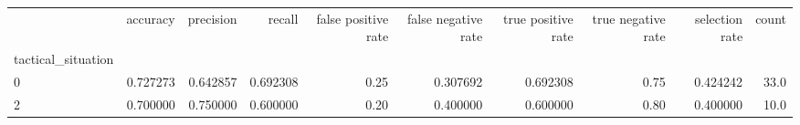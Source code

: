 \begin{tabular}{lrrrrrrrrr}
\toprule
{} &  accuracy &  precision &    recall &  false positive rate &  false negative rate &  true positive rate &  true negative rate &  selection rate &  count \\
tactical\_situation &           &            &           &                      &                      &                     &                     &                 &        \\
\midrule
0                  &  0.727273 &   0.642857 &  0.692308 &                 0.25 &             0.307692 &            0.692308 &                0.75 &        0.424242 &   33.0 \\
2                  &  0.700000 &   0.750000 &  0.600000 &                 0.20 &             0.400000 &            0.600000 &                0.80 &        0.400000 &   10.0 \\
\bottomrule
\end{tabular}

